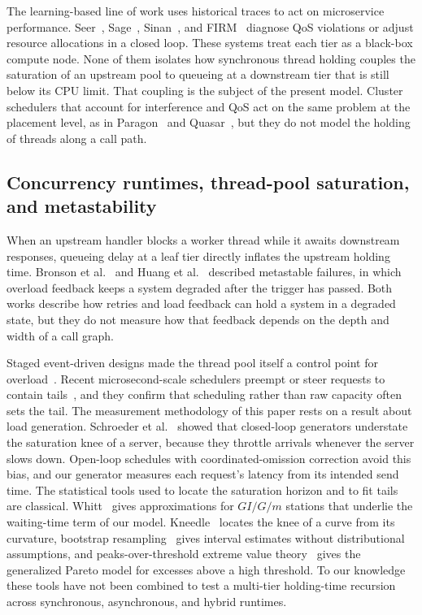 The learning-based line of work uses historical traces to act on microservice performance. Seer~\cite{gan2019seer}, Sage~\cite{gan2021sage}, Sinan~\cite{zhang2021sinan}, and FIRM~\cite{qiu2020firm} diagnose QoS violations or adjust resource allocations in a closed loop. These systems treat each tier as a black-box compute node. None of them isolates how synchronous thread holding couples the saturation of an upstream pool to queueing at a downstream tier that is still below its CPU limit. That coupling is the subject of the present model. Cluster schedulers that account for interference and QoS act on the same problem at the placement level, as in Paragon~\cite{delimitrou2013paragon} and Quasar~\cite{delimitrou2014quasar}, but they do not model the holding of threads along a call path.

\subsection{Concurrency runtimes, thread-pool saturation, and metastability}

When an upstream handler blocks a worker thread while it awaits downstream responses, queueing delay at a leaf tier directly inflates the upstream holding time. Bronson et al.~\cite{bronson2021metastable} and Huang et al.~\cite{huang2022metastable} described metastable failures, in which overload feedback keeps a system degraded after the trigger has passed. Both works describe how retries and load feedback can hold a system in a degraded state, but they do not measure how that feedback depends on the depth and width of a call graph.

Staged event-driven designs made the thread pool itself a control point for overload~\cite{welsh2001seda}. Recent microsecond-scale schedulers preempt or steer requests to contain tails~\cite{kaffes2019shinjuku,ousterhout2019shenango}, and they confirm that scheduling rather than raw capacity often sets the tail. The measurement methodology of this paper rests on a result about load generation. Schroeder et al.~\cite{schroeder2006open} showed that closed-loop generators understate the saturation knee of a server, because they throttle arrivals whenever the server slows down. Open-loop schedules with coordinated-omission correction avoid this bias, and our generator measures each request's latency from its intended send time. The statistical tools used to locate the saturation horizon and to fit tails are classical. Whitt~\cite{whitt1993ggm} gives approximations for $GI/G/m$ stations that underlie the waiting-time term of our model. Kneedle~\cite{satopaa2011kneedle} locates the knee of a curve from its curvature, bootstrap resampling~\cite{efron1979bootstrap} gives interval estimates without distributional assumptions, and peaks-over-threshold extreme value theory~\cite{pickands1975extreme,davison1990exceedances} gives the generalized Pareto model for excesses above a high threshold. To our knowledge these tools have not been combined to test a multi-tier holding-time recursion across synchronous, asynchronous, and hybrid runtimes.

